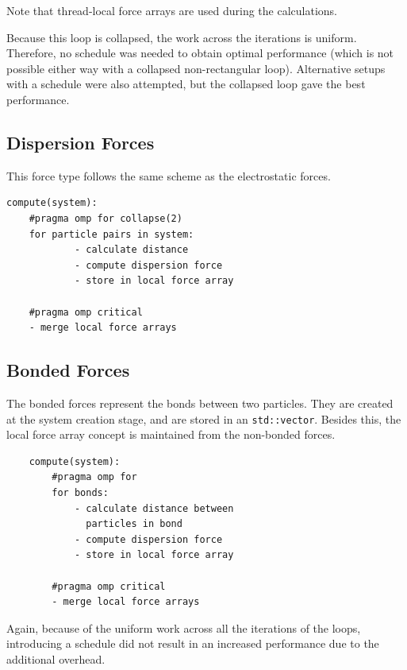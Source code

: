 \documentclass[conference]{IEEEtran}
\begin{document}
Note that thread-local force arrays are used during the calculations.

Because this loop is collapsed, the work across the iterations is uniform. Therefore, no schedule was needed to 
obtain optimal performance (which is not possible either way with a collapsed non-rectangular loop). Alternative setups 
with a schedule were also attempted, but the collapsed loop gave the best performance.

\subsection{Dispersion Forces}
This force type follows the same scheme as the electrostatic forces.

\begin{lstlisting}
compute(system):
    #pragma omp for collapse(2)
    for particle pairs in system:
            - calculate distance
            - compute dispersion force
            - store in local force array

    #pragma omp critical
    - merge local force arrays
\end{lstlisting}

\subsection{Bonded Forces}
The bonded forces represent the bonds between two particles. They are created at the system creation stage, and are
stored in an \texttt{std::vector}. Besides this, the local force array concept is maintained from the non-bonded
forces.
\begin{lstlisting}
    compute(system):
        #pragma omp for
        for bonds:
            - calculate distance between 
              particles in bond
            - compute dispersion force
            - store in local force array
    
        #pragma omp critical
        - merge local force arrays
\end{lstlisting}
Again, because of the uniform work across all the iterations of the loops, introducing a schedule did not result in
an increased performance due to the additional overhead.
\end{document}
